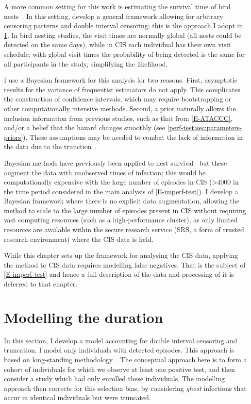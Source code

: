 \documentclass[thesis.tex]{subfiles}
\begin{document}
A more common setting for this work is estimating the survival time of bird nests~\autocite{heiseyABCs}.
In this setting, \textcite{heiseyModelling} develop a general framework allowing for arbitrary censoring patterns and double interval censoring; this is the approach I adopt in \cref{perf-test:sec:model}.
In bird nesting studies, the visit times are normally global (all nests could be detected on the same days), while in CIS each individual has their own visit schedule; with global visit times the probability of being detected is the same for all participants in the study, simplifying the likelihood.

I use a Bayesian framework for this analysis for two reasons.
First, asymptotic results for the variance of frequentist estimators do not apply.
This complicates the construction of confidence intervals, which may require bootstrapping or other computationally intensive methods.
Second, a prior naturally allows the inclusion information from previous studies, such as that from \cref{E-ATACCC}, and/or a belief that the hazard changes smoothly (see \cref{perf-test:sec:parameters-priors}).
These assumptions may be needed to combat the lack of information in the data due to the trunction~\autocite{caoBias}.

Bayesian methods have previously been applied to nest survival~\autocites{heBayesiana}{heBayesian}{caoModeling} but these augment the data with unobserved times of infection; this would be computationally expensive with the large number of episodes in CIS (>4000 in the time period considered in the main analysis of \cref{E-imperf-test}).
I develop a Bayesian framework where there is no explicit data augmentation, allowing the method to scale to the large number of episodes present in CIS without requiring vast computing resources (such as a high-performance cluster), as only limited resources are available within the secure research service (SRS, a form of trusted research environment) where the CIS data is held.

While this chapter sets up the framework for analysing the CIS data, applying the method to CIS data requires modelling false negatives.
That is the subject of \cref{E-imperf-test} and hence a full description of the data and processing of it is deferred to that chapter.

\section{Modelling the duration}\label{perf-test:sec:model}
In this section, I develop a model accounting for double interval censoring and truncation.
I model only individuals with detected episodes.
This approach is based on long-standing methodology~\autocites{heiseyModelling}{dempsterMaximum}{turnbullEmpirical}.
The conceptual approach here is to form a cohort of individuals for which we observe at least one positive test, and then consider a study which had only enrolled these individuals.
The modelling approach then corrects for this selection bias, by considering \emph{ghost} infections that occur in identical individuals but were truncated.
\end{document}
